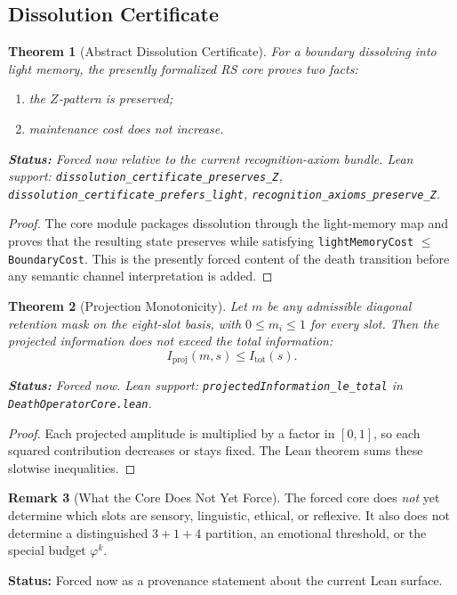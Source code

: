 \documentclass[11pt,a4paper]{article}
\newtheorem{theorem}{Theorem}[section]
\theoremstyle{definition}
\newtheorem{remark}[theorem]{Remark}
\newcommand{\phig}{\varphi}
\newcommand{\Zp}{Z}
\newcommand{\code}[1]{\texttt{\small #1}}
\newcommand{\codename}[1]{\texttt{\small\detokenize{#1}}}
\newcommand{\statusline}[1]{\par\smallskip\noindent\textbf{Status:} #1\par\smallskip}
\begin{document}
\subsection{Dissolution Certificate}

\begin{theorem}[Abstract Dissolution Certificate]
\label{thm:dissolution}
For a boundary dissolving into light memory, the presently formalized RS
core proves two facts:
\begin{enumerate}[label=(\alph*)]
\item the $\Zp$-pattern is preserved;
\item maintenance cost does not increase.
\end{enumerate}
\statusline{Forced now relative to the current recognition-axiom bundle.
Lean support: \code{dissolution\_certificate\_preserves\_Z},
\code{dissolution\_certificate\_prefers\_light},
\code{recognition\_axioms\_preserve\_Z}.}
\end{theorem}

\begin{proof}
The core module packages dissolution through the light-memory map and proves
that the resulting state preserves \codename{Z_light_memory = Z_boundary}
while satisfying \code{lightMemoryCost} $\le$ \code{BoundaryCost}.  This is the
presently forced content of the death transition before any semantic
channel interpretation is added.
\end{proof}

\begin{theorem}[Projection Monotonicity]
\label{thm:proj-bound}
Let $m$ be any admissible diagonal retention mask on the eight-slot basis,
with $0 \le m_i \le 1$ for every slot.  Then the projected information does
not exceed the total information:
\[
  I_{\mathrm{proj}}(m,s) \le I_{\mathrm{tot}}(s).
\]
\statusline{Forced now. Lean support: \code{projectedInformation\_le\_total}
in \code{DeathOperatorCore.lean}.}
\end{theorem}

\begin{proof}
Each projected amplitude is multiplied by a factor in $[0,1]$, so each
squared contribution decreases or stays fixed.  The Lean theorem sums these
slotwise inequalities.
\end{proof}

\begin{remark}[What the Core Does Not Yet Force]
\label{rem:core-limit}
The forced core does \emph{not} yet determine which slots are sensory,
linguistic, ethical, or reflexive.  It also does not determine a distinguished
$3+1+4$ partition, an emotional threshold, or the special budget $\phig^k$.
\statusline{Forced now as a provenance statement about the current Lean
surface.}
\end{remark}
\end{document}
